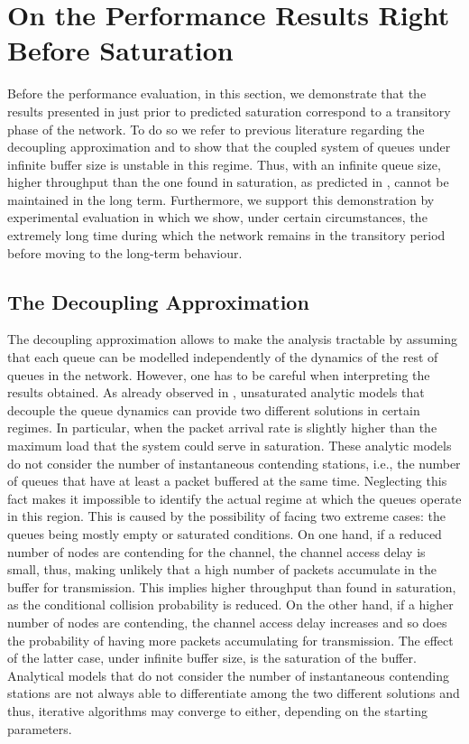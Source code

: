 \documentclass[preprint,12pt]{elsarticle}
\begin{document}
\section{On the Performance Results Right Before Saturation}\label{sec:demonstration}

Before the performance evaluation, in this section, we demonstrate that the results presented in \cite{chung2006performance} just prior to predicted saturation correspond to a transitory phase of the network. To do so we refer to previous literature regarding the decoupling approximation and to show that the coupled system of queues under infinite buffer size is unstable in this regime. Thus, with an infinite queue size, higher throughput than the one found in saturation, as predicted in \cite{chung2006performance}, cannot be maintained in the long term. Furthermore, we support this demonstration by experimental evaluation in which we show, under certain circumstances, the extremely long time during which the network remains in the transitory period before moving to the long-term behaviour. 


\subsection{The Decoupling Approximation}

The decoupling approximation allows to make the analysis tractable by assuming that each queue can be modelled independently of the dynamics of the rest of queues in the network. However, one has to be careful when interpreting the results obtained. As already observed in \cite{Duffy2010}, unsaturated analytic models that decouple the queue dynamics can provide two different solutions in certain regimes. In particular, when the packet arrival rate is slightly higher than the maximum load that the system could serve in saturation. These analytic models do not consider the number of instantaneous contending stations, i.e., the number of queues that have at least a packet buffered at the same time. Neglecting this fact makes it impossible to identify the actual regime at which the queues operate in this region. This is caused by the possibility of facing two extreme cases: the queues being mostly empty or saturated conditions. On one hand, if a reduced number of nodes are contending for the channel, the channel access delay is small, thus, making unlikely that a high number of packets accumulate in the buffer for transmission. This implies higher throughput than found in saturation, as the conditional collision probability is reduced. On the other hand, if a higher number of nodes are contending, the channel access delay increases and so does the probability of having more packets accumulating for transmission. The effect of the latter case, under infinite buffer size, is the saturation of the buffer. Analytical models that do not consider the number of instantaneous contending stations are not always able to differentiate among the two different solutions and thus, iterative algorithms may converge to either, depending on the starting parameters.
\end{document}
